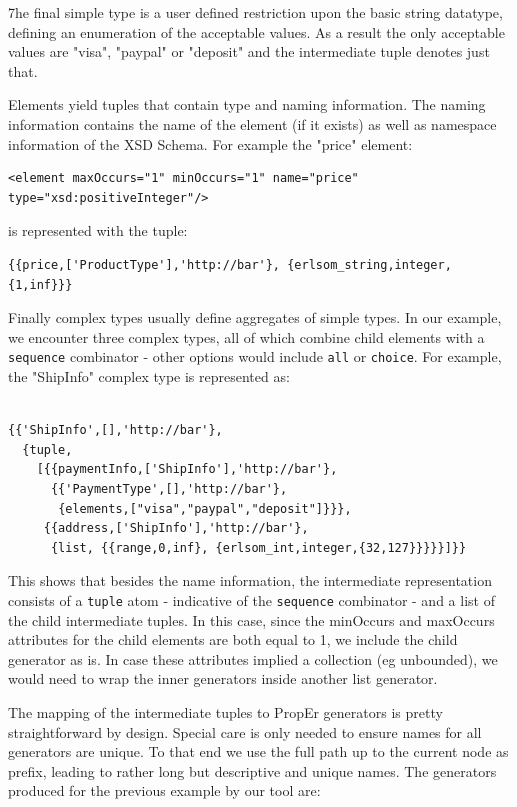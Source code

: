\documentclass[submission,copyright,a4]{eptcs}
\begin{document}
7he final simple type is a user defined restriction upon the basic string datatype, 
defining an enumeration of the acceptable values. As a result the only acceptable 
values are "visa", "paypal" or "deposit" and the intermediate tuple denotes just that.

Elements yield tuples that contain type and naming information. The naming information 
contains the name of the element (if it exists) as well as namespace information of 
the XSD Schema. For example the "price" element:

\begin{lstlisting}
<element maxOccurs="1" minOccurs="1" name="price" type="xsd:positiveInteger"/>
\end{lstlisting}

is represented with the tuple:

\begin{lstlisting}
{{price,['ProductType'],'http://bar'}, {erlsom_string,integer,{1,inf}}}
\end{lstlisting}

Finally complex types usually define aggregates of simple types. In our example, we 
encounter three complex types, all of which combine child elements with a \texttt{sequence}
combinator - other options would include \texttt{all} or \texttt{choice}. For example, 
the "ShipInfo" complex type is represented as:

\begin{lstlisting}

{{'ShipInfo',[],'http://bar'},
  {tuple,
    [{{paymentInfo,['ShipInfo'],'http://bar'},
      {{'PaymentType',[],'http://bar'},
       {elements,["visa","paypal","deposit"]}}},
     {{address,['ShipInfo'],'http://bar'},
      {list, {{range,0,inf}, {erlsom_int,integer,{32,127}}}}}]}}
\end{lstlisting}

This shows that besides the name information, the intermediate representation consists of a 
\texttt{tuple} atom - indicative of the \texttt{sequence} combinator - and a list of the 
child intermediate tuples. In this case, since the minOccurs and maxOccurs attributes for 
the child elements are both equal to 1, we include the child generator as is. In case these
attributes implied a collection (eg unbounded), we would need to wrap the inner generators 
inside another list generator.


The mapping of the intermediate tuples to PropEr generators is pretty straightforward by design. 
Special care is only needed to ensure names for all generators are unique. To that end we use 
the full path up to the current node as prefix, leading to rather long but descriptive and unique 
names. The generators produced for the previous example by our tool are:
\end{document}
